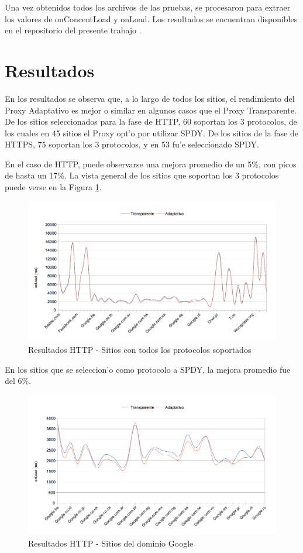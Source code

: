 Una vez obtenidos todos los archivos de las pruebas, se procesaron para extraer los valores de onConcentLoad y onLoad. Los resultados se encuentran disponibles en el repositorio del presente trabajo \citep{tfl}.

\section{Resultados}

En los resultados se observa que, a lo largo de todos los sitios, el rendimiento del Proxy Adaptativo es mejor o similar en algunos casos que el Proxy Transparente. De los sitios seleccionados para la fase de HTTP, 60 soportan los 3 protocolos, de los cuales en 45 sitios el Proxy opt'o por utilizar SPDY. De los sitios de la fase de HTTPS, 75 soportan los 3 protocolos, y en 53 fu'e seleccionado SPDY.

En el caso de HTTP, puede observarse una mejora promedio de un 5\%, con picos de hasta un 17\%. La vista general de los sitios que soportan los 3 protocolos puede verse en la Figura \ref{resGralHTTP}.

\begin{figure}[h!]
  	\centering
	\includegraphics[width=\textwidth]{img/resGralHTTP}
	\caption{\small Resultados HTTP - Sitios con todos los protocolos soportados}
	\label{resGralHTTP}
\end{figure}

En los sitios que se seleccion'o como protocolo a SPDY, la mejora promedio fue del 6\%.
 
 \begin{figure}[h!]
  	\centering
	\includegraphics[width=\textwidth]{img/resGoogleHTTP}
	\caption{\small Resultados HTTP - Sitios del dominio Google}
	\label{resGoogleHTTP}
\end{figure}


